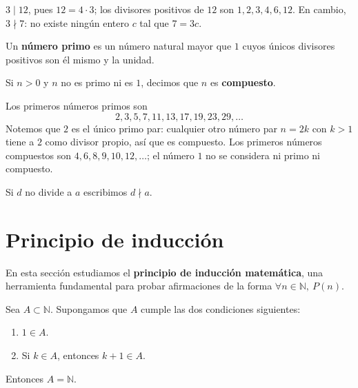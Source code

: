 \documentclass[12pt,a4paper]{book}
\begin{document}
  \begin{ejemplo}
    $3\mid 12$, pues $12=4\cdot 3$; los divisores positivos de $12$ son $1,2,3,4,6,12$. En cambio, $3\nmid 7$: no existe ningún entero $c$ tal que $7=3c$.
  \end{ejemplo}
  
  \begin{definicion}
    Un \textbf{número primo} es un número natural mayor que $1$ cuyos únicos divisores positivos son él mismo y la unidad.
  \end{definicion}
  
  \begin{definicion}
    Si $n>0$ y $n$ no es primo ni es $1$, decimos que $n$ es \textbf{compuesto}.
  \end{definicion}
  
  \begin{ejemplo}
    Los primeros números primos son
    \begin{equation*}
      2,3,5,7,11,13,17,19,23,29,\dots
    \end{equation*}
    Notemos que $2$ es el único primo par: cualquier otro número par $n=2k$ con $k>1$ tiene a $2$ como divisor propio, así que es compuesto. Los primeros números compuestos son $4,6,8,9,10,12,\dots$; el número $1$ no se considera ni primo ni compuesto.
  \end{ejemplo}
  
  Si $d$ no divide a $a$ escribimos $d \nmid a$.
  
  \section{Principio de inducción}
  
  En esta sección estudiamos el \textbf{principio de inducción matemática}, una herramienta fundamental para probar afirmaciones de la forma $\forall n \in \mathbb{N},\ P(n)$.
  
  \begin{proposicion}
    Sea $A \subset \mathbb{N}$. Supongamos que $A$ cumple las dos condiciones siguientes:
    \begin{enumerate}[label=(\alph*)]
      \item $1 \in A$.
      \item Si $k \in A$, entonces $k+1 \in A$.
    \end{enumerate}
    Entonces $A=\mathbb{N}$.
  \end{proposicion}
  
\end{document}
